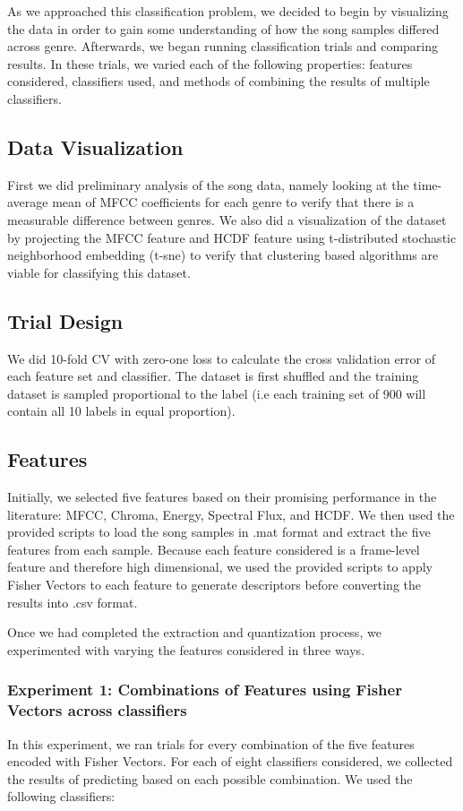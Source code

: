 As we approached this classification problem, we decided to begin by visualizing the data in order to gain some understanding of how the song samples differed across genre. Afterwards, we began running classification trials and comparing results. In these trials, we varied each of the following properties: features considered, classifiers used, and methods of combining the results of multiple classifiers.

\subsection{Data Visualization}
First we did preliminary analysis of the song data, namely looking at the time-average mean of MFCC coefficients for each genre to verify that there is a measurable difference between genres. We also did a visualization of the dataset by projecting the MFCC feature and HCDF feature using t-distributed stochastic neighborhood embedding (t-sne)  to verify that clustering based algorithms are viable for classifying this dataset.

\subsection{Trial Design}
We did 10-fold CV with zero-one loss to calculate the cross validation error of each feature set and classifier. The dataset is first shuffled and the training dataset is sampled proportional to the label (i.e each training set of 900 will contain all 10 labels in equal proportion).

\subsection{Features}
Initially, we selected five features based on their promising performance in the literature: MFCC, Chroma, Energy, Spectral Flux, and HCDF. We then used the provided scripts to load the song samples in .mat format and extract the five features from each sample. Because each feature considered is a frame-level feature and therefore high dimensional, we used the provided scripts to apply Fisher Vectors to each feature to generate descriptors before converting the results into .csv format. 

Once we had completed the extraction and quantization process, we experimented with varying the features considered in three ways.

\subsubsection{Experiment 1: Combinations of Features using Fisher Vectors across classifiers}
In this experiment, we ran trials for every combination of the five features encoded with Fisher Vectors. For each of eight classifiers considered, we collected the results of predicting based on each possible combination. We used the following classifiers:


